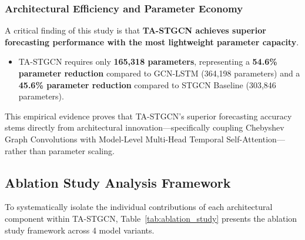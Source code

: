 \subsubsection{Architectural Efficiency and Parameter Economy}
A critical finding of this study is that \textbf{TA-STGCN achieves superior forecasting performance with the most lightweight parameter capacity}.
\begin{itemize}
    \item TA-STGCN requires only \textbf{165,318 parameters}, representing a \textbf{54.6\% parameter reduction} compared to GCN-LSTM (364,198 parameters) and a \textbf{45.6\% parameter reduction} compared to STGCN Baseline (303,846 parameters).
\end{itemize}
This empirical evidence proves that TA-STGCN's superior forecasting accuracy stems directly from architectural innovation—specifically coupling Chebyshev Graph Convolutions with Model-Level Multi-Head Temporal Self-Attention—rather than parameter scaling.

\subsection{Ablation Study Analysis Framework}

To systematically isolate the individual contributions of each architectural component within TA-STGCN, Table~\ref{tab:ablation_study} presents the ablation study framework across 4 model variants.

\begin{table}[h]
\centering
\caption{Ablation Study Framework for TA-STGCN Architectural Components.}
\label{tab:ablation_study}
\end{table}

